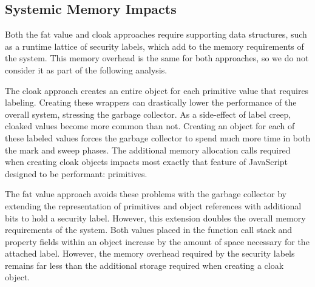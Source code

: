 \subsection{Systemic Memory Impacts}\label{sec:garbage-collection}

Both the fat value and cloak approaches require supporting data structures, such as a runtime lattice of security labels, which add to the memory requirements of the system.
This memory overhead is the same for both approaches, so we do not consider it as part of the following analysis.

The cloak approach creates an entire object for each primitive value that requires labeling.
Creating these wrappers can drastically lower the performance of the overall system, stressing the garbage collector.
As a side-effect of label creep, cloaked values become more common than not.
Creating an object for each of these labeled values forces the garbage collector to spend much more time in both the mark and sweep phases.
The additional memory allocation calls required when creating cloak objects impacts most exactly that feature of JavaScript designed to be performant: primitives.

The fat value approach avoids these problems with the garbage collector by extending the representation of primitives and object references with additional bits to hold a security label.
However, this extension doubles the overall memory requirements of the system.
Both values placed in the function call stack and property fields within an object increase by the amount of space necessary for the attached label.
However, the memory overhead required by the security labels remains far less than the additional storage required when creating a cloak object.

